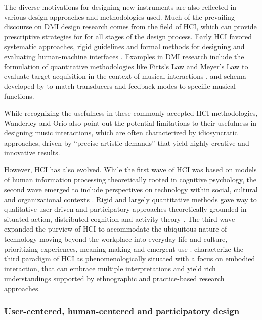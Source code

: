 \documentclass[Sullivan_phd_thesis.tex]{subfiles}
\begin{document}
The diverse motivations for designing new instruments are also reflected in various design approaches and methodologies used. Much of the prevailing discourse on DMI design research comes from the field of HCI, which can provide prescriptive strategies for for all stages of the design process. Early HCI favored systematic approaches, rigid guidelines and formal methods for designing and evaluating human-machine interfaces \parencite{Bodker2015}. Examples in DMI research include the formulation of quantitative methodologies like Fitts's Law and Meyer's Law to evaluate target acquisition in the context of musical interactions \textcite{Wanderley2002}, and schema developed by \textcite{Vertegaal1996c} to match transducers and feedback modes to specific musical functions.

While recognizing the usefulness in these commonly accepted HCI methodologies, Wanderley and Orio also point out the potential limitations to their usefulness in designing music interactions, which are often characterized by idiosyncratic approaches, driven by ``precise artistic demands'' \parencite*[p. 67]{Wanderley2002} that yield highly creative and innovative results.

However, HCI has also evolved. While the first wave of HCI was based on models of human information processing theoretically rooted in cognitive psychology, the second wave emerged to include perspectives on technology within social, cultural and organizational contexts \parencite{kaptelinin2003}. Rigid and largely quantitative methods gave way to qualitative user-driven and participatory approaches theoretically grounded in situated action, distributed cognition and activity theory \parencite{Bodker2006}. The third wave expanded the purview of HCI to accommodate the ubiquitous nature of technology moving beyond the workplace into everyday life and culture, prioritizing experiences, meaning-making and emergent use \parencite{Bodker2015}. \textcite{Harrison2007} characterize the third paradigm of HCI as phenomenologically situated with a focus on embodied interaction, that can embrace multiple interpretations and yield rich understandings supported by ethnographic and practice-based research approaches.

\subsubsection{User-centered, human-centered and participatory design}
\label{ch3-sec:user-centered-design}
\end{document}
